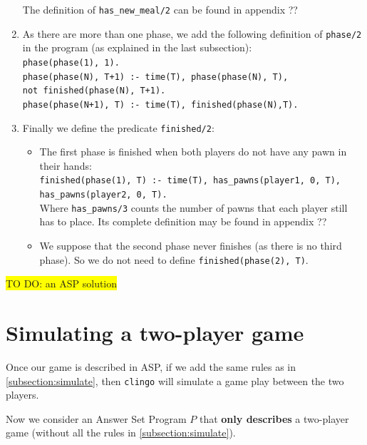 \begin{enumerate}
The definition of \texttt{has\_new\_meal/2} can be found in appendix ??

\item As there are more than one phase, we add the following definition of \texttt{phase/2} in the program (as explained in the last subsection):\\
\texttt{phase(phase(1), 1).}\\
\texttt{phase(phase(N), T+1) :- time(T), phase(phase(N), T),\\ not finished(phase(N), T+1).}\\
\texttt{phase(phase(N+1), T) :- time(T), finished(phase(N),T).}

\item Finally we define the predicate \texttt{finished/2}:
\begin{itemize}
\item The first phase is finished when both players do not have any pawn in their hands: \\
\texttt{finished(phase(1), T) :- time(T), has\_pawns(player1, 0, T), \\has\_pawns(player2, 0, T).}\\
Where \texttt{has\_pawns/3} counts the number of pawns that each player still has to place. Its complete definition may be found in appendix ??
\item We suppose that the second phase never finishes (as there is no third phase). So we do not need to define \texttt{finished(phase(2), T)}. 
\end{itemize}
\end{enumerate}

\colorbox{yellow}{TO DO: an ASP solution}



\section{Simulating a two-player game}



Once our game is described in ASP, if we add the same rules as in \ref{subsection:simulate}, then \texttt{clingo} will simulate a game play between the two players.

\bigskip

Now we consider an Answer Set Program $P$ that \textbf{only describes} a two-player game (without all the rules in \ref{subsection:simulate}). 

